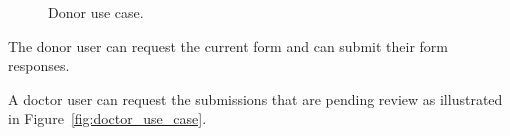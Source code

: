 \begin{figure}[h]
	\begin{center}
	\end{center}
	\caption{Donor use case.}\label{fig:donor_use_case}
\end{figure}

The donor user can request the current form and can submit their form responses.

\pagebreak

A doctor user can request the submissions that are pending review as illustrated in Figure~\ref{fig:doctor_use_case}.

